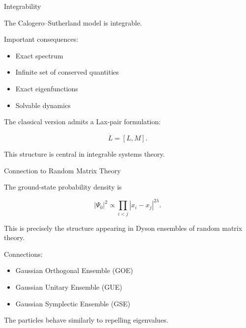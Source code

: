 \documentclass{beamer}
\begin{document}
\begin{frame}{Integrability}

The Calogero--Sutherland model is integrable.

\vspace{0.3cm}

Important consequences:

\begin{itemize}
    \item Exact spectrum
    \item Infinite set of conserved quantities
    \item Exact eigenfunctions
    \item Solvable dynamics
\end{itemize}

\vspace{0.4cm}

The classical version admits a Lax-pair formulation:

\[
\dot{L} = [L,M].
\]

\vspace{0.3cm}

This structure is central in integrable systems theory.

\end{frame}

\begin{frame}{Connection to Random Matrix Theory}

The ground-state probability density is

\[
|\Psi_0|^2
\propto
\prod_{i<j}
|x_i-x_j|^{2\lambda}.
\]

\vspace{0.3cm}

This is precisely the structure appearing in Dyson ensembles
of random matrix theory.

\vspace{0.3cm}

Connections:
\begin{itemize}
    \item Gaussian Orthogonal Ensemble (GOE)
    \item Gaussian Unitary Ensemble (GUE)
    \item Gaussian Symplectic Ensemble (GSE)
\end{itemize}

\vspace{0.3cm}

The particles behave similarly to repelling eigenvalues.

\end{frame}
\end{document}
